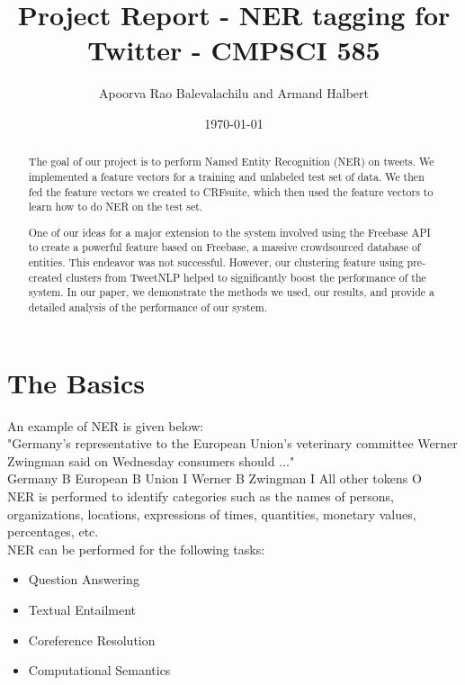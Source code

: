 \documentclass[a4paper]{article}
\title{Project Report - NER tagging for Twitter - CMPSCI 585}
\author{Apoorva Rao Balevalachilu and Armand Halbert}
\date{\today}
\begin{document}
\maketitle

\begin{abstract}

The goal of our project is to perform Named Entity Recognition (NER) on tweets. We implemented a  feature vectors for a training and unlabeled test set of data. We then fed the feature vectors we created to CRFsuite, which then used the feature vectors to learn how to do NER on the test set.

One of our ideas for a major extension to the system involved using the Freebase API to create a powerful feature based on Freebase, a massive crowdsourced database of entities. This endeavor was not successful. However, our clustering feature using pre-created clusters from TweetNLP helped to significantly boost the performance of the system. In our paper, we demonstrate the methods we used, our results, and provide a detailed analysis of the performance of our system.  

\end{abstract}

\section{The Basics}

An example of NER is given below: \\

"Germany’s representative to the European Union’s veterinary
committee Werner Zwingman said on Wednesday consumers should ..." \\

Germany  B 
European  B
Union  I
Werner  B 
Zwingman  I
All other tokens O \\

NER is performed to identify categories such as the names of persons, organizations, locations, expressions of times, quantities, monetary values, percentages, etc.
 \\

NER can be performed for the following tasks: 
\begin{itemize}
\item Question Answering
\item Textual Entailment
\item Coreference Resolution
\item Computational Semantics
\end{itemize} 
\end{document}
